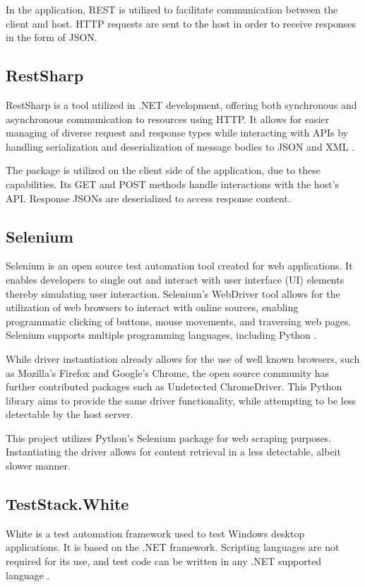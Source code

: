 \documentclass{thesis-ekf}
\theoremstyle{definition}
\theoremstyle{remark}
\begin{document}
In the application, REST is utilized to facilitate communication between the client and host. HTTP requests are sent to the host in order to receive responses in the form of JSON.  

\subsection{RestSharp} \label{restsharp}
RestSharp is a tool utilized in .NET development, offering both synchronous and asynchronous communication to resources using HTTP. It allows for easier managing of diverse request and response types while interacting with APIs by handling serialization and deserialization of message bodies to JSON and XML \cite{restsharp}.

The package is utilized on the client side of the application, due to these capabilities. Its GET and POST methods handle interactions with the host's API. Response JSONs are deserialized to access response content.

\subsection{Selenium}
Selenium is an open source test automation tool created for web applications. It enables developers to single out and interact with user interface (UI) elements thereby simulating user interaction. Selenium's WebDriver tool allows for the utilization of web browsers to interact with online sources, enabling programmatic clicking of buttons, mouse movements, and traversing web pages. Selenium supports multiple programming languages, including Python \cite{selenium}.

While driver instantiation already allows for the use of well known browsers, such as Mozilla's Firefox and Google's Chrome, the open source community has further contributed packages such as Undetected ChromeDriver. This Python library aims to provide the same driver functionality, while attempting to be less detectable by the host server. \cite{udc}

This project utilizes Python's Selenium package for web scraping purposes. Instantiating the driver allows for content retrieval in a less detectable, albeit slower manner.

\subsection{TestStack.White}
White is a test automation framework used to test Windows desktop applications. It is based on the .NET framework. Scripting languages are not required for its use, and test code can be written in any .NET supported language \cite{docs-white}.
\end{document}
